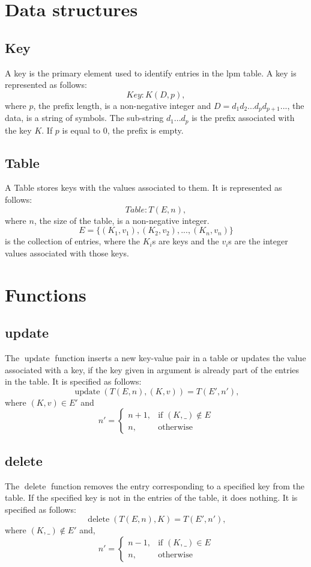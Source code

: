 \documentclass{article}
\DeclareMathOperator{\update}{update}
\DeclareMathOperator{\delete}{delete}
\begin{document}
\section{Data structures}
\subsection{Key}
A key is the primary element used to identify entries in the lpm table. A key
is represented as follows:
\[
    Key: K(D, p),
\]
where $p$, the prefix length, is a non-negative integer and
$D = d_1d_2...d_pd_{p+1}...$, the data,  is a string of symbols.
The sub-string $d_1...d_p$ is the prefix associated with the key $K$. If $p$ is
equal to 0, the prefix is empty.
\subsection{Table}
A Table stores keys with the values associated to them. It is represented as
follows:
\[
    Table: T(E, n),
\]
where $n$, the size of the table, is a non-negative integer.
\[
    E = \{(K_1, v_1), (K_2, v_2), ..., (K_n, v_n)\}
\]
is the collection of entries,
where the $K_i$s are keys and the $v_i$s are the integer values associated with
those keys.
\section{Functions}
\subsection{update}
The $\update$ function inserts a new key-value pair in a table or updates the value
associated with a key, if the key given in argument is already part of the
entries in the table. It is specified as follows:
\[
    \update(T(E, n), (K, v)) = T(E', n'),
\]
where $(K, v) \in E'$ and\newline
\[
    n'=
    \begin{cases}
    n+1,   & \text{if } (K, \_) \notin E\\
    n,  & \text{otherwise}
    \end{cases}
\]
\subsection{delete}
The $\delete$ function removes the entry corresponding to a specified key from the
table. If the specified key is not in the entries of the table, it does nothing.
It is specified as follows:
\[
    \delete(T(E, n), K) = T(E', n'),
\]
where $(K, \_) \notin E'$ and,
\[
    n'=
    \begin{cases}
    n-1,    & \text{if } (K, \_) \in E\\
    n,              & \text{otherwise}
    \end{cases}
\]
\end{document}
